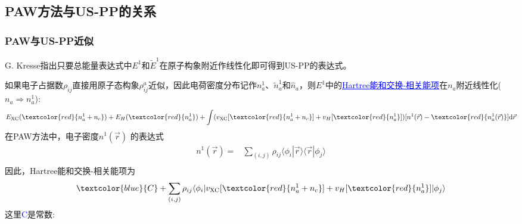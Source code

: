 \subsection{\rm{PAW}方法与\rm{US-PP}的关系}
\frame
{
	\frametitle{\textrm{PAW}与\textrm{US-PP}近似}
	\textrm{G. Kresse}指出只要总能量表达式中$E^1$和$\tilde E^1$在原子构象附近作线性化即可得到\textrm{US-PP}的表达式。
	
	如果电子占据数$\rho_{ij}$直接用原子态构象$\rho_{ij}^a$近似，因此电荷密度分布记作$n_a^1$、$\tilde n_a^1$和$\hat n_a$，则$E^1$中的\textcolor{blue}{\underline{\textrm{Hartree}能和交换-相关能项}}在$n_a$附近线性化($n_a\Rightarrow n_a^1$):
	\begin{displaymath}
		E_{\mathrm{XC}}(\textcolor{red}{n_a^1+n_c})+E_H(\textcolor{red}{n_a^1})+\int(v_{\mathrm{XC}}[\textcolor{red}{n_a^1+n_c}]+v_H[\textcolor{red}{n_a^1}])[n^1(\vec r)-\textcolor{red}{n_a^1(\vec r)}]\mathrm{d}\vec r
	\end{displaymath}
	在\textrm{PAW}方法中，电子密度$n^1(\vec r)$%
	的表达式
	\begin{displaymath}
		\begin{aligned}
			n^1(\vec r)=&\sum_{(i,j)}\rho_{ij}\langle\phi_i|\vec r\rangle\langle\vec r|\phi_j\rangle\\
		\end{aligned}
	\end{displaymath}
	因此，\textrm{Hartree}能和交换-相关能项为
	$$\textcolor{blue}{C}+\sum_{(i,j)}\rho_{ij}\langle\phi_i|v_{\mathrm{XC}}[\textcolor{red}{n_a^1+n_c}]+v_H[\textcolor{red}{n_a^1}]|\phi_j\rangle$$
	这里\textcolor{blue}{\textrm{C}}是常数:~{\fontsize{7.1pt}{3.9pt}}
}

